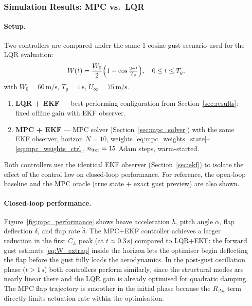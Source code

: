 \subsubsection{Simulation Results: MPC vs.\ LQR}
\label{sec:mpc_results}

\paragraph{Setup.}
Two controllers are compared under the same 1-cosine gust scenario used for
the LQR evaluation:
\begin{equation}
  W(t) = \frac{W_0}{2}\Bigl(1 - \cos\tfrac{2\pi t}{T_g}\Bigr),
  \quad 0 \le t \le T_g,
\end{equation}
with $W_0 = 60\,\text{m/s}$, $T_g = 1\,\text{s}$, $U_\infty = 75\,\text{m/s}$.
\begin{enumerate}
  \item \textbf{LQR + EKF} --- best-performing configuration from
        Section~\ref{sec:results}: fixed offline gain with EKF observer.
  \item \textbf{MPC + EKF} --- MPC solver (Section~\ref{sec:mpc_solver})
        with the same EKF observer, horizon $N=10$, weights
        \eqref{eq:mpc_weights_state}--\eqref{eq:mpc_weights_ctrl},
        $n_{\rm iter}=15$ Adam steps, warm-started.
\end{enumerate}
Both controllers use the identical EKF observer (Section~\ref{sec:ekf}) to
isolate the effect of the control law on closed-loop performance.
For reference, the open-loop baseline and the MPC oracle (true state + exact
gust preview) are also shown.

\paragraph{Closed-loop performance.}
Figure~\ref{fig:mpc_performance} shows heave acceleration $\ddot{h}$, pitch
angle $\alpha$, flap deflection $\delta$, and flap rate $\dot{\delta}$.
The MPC+EKF controller achieves a larger reduction in the first $C_L$ peak
(at $t \approx 0.3\,\text{s}$) compared to LQR+EKF: the forward gust estimate
\eqref{eq:W_extrap} inside the horizon lets the optimiser begin deflecting the
flap before the gust fully loads the aerodynamics.
In the post-gust oscillation phase ($t > 1\,\text{s}$) both controllers perform
similarly, since the structural modes are nearly linear there and the LQR gain
is already optimised for quadratic damping.
The MPC flap trajectory is smoother in the initial phase because the
$R_{\Delta u}$ term directly limits actuation rate within the optimisation.

